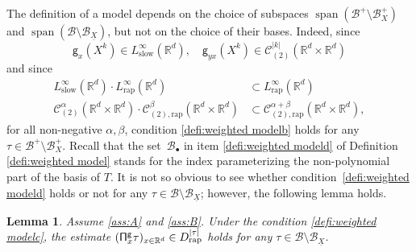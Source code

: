 \documentclass[10pt]{amsart}
\newcommand{\sbullet}{{\scriptscriptstyle\bullet}}
\DeclareMathOperator{\Span}{span}
\theoremstyle{plain}
\newtheorem{lem}[thm]{Lemma}
\theoremstyle{definition}
\newcommand{\rap}{\mathrm{rap}}
\newcommand{\slow}{\mathrm{slow}}
\newcommand{\sfg}{\mathsf{g}}
\newcommand{\bbR}{\mathbb{R}}
\newcommand{\mcB}{\mathcal{B}}
\newcommand{\mcC}{\mathcal{C}}
\begin{document}
The definition of a model depends on the choice of subspaces $\Span (\mcB^+\setminus\mcB_X^+)$ and $\Span (\mcB\setminus\mcB_{\underline{X}})$, but not on the choice of their bases.
Indeed, since
\[
\sfg_x(X^k)\in L_\slow^\infty(\bbR^d),\quad \sfg_{yx}(X^k)\in\mcC_{(2)}^{|k|}(\bbR^d\times\bbR^d)
\]
and since
\begin{align*}
L_\slow^\infty(\bbR^d)\cdot L_\rap^\infty(\bbR^d)&\subset L_\rap^\infty(\bbR^d)\\
\tag*{and}\mcC_{(2)}^\alpha(\bbR^d\times\bbR^d)\cdot\mcC_{(2),\rap}^\beta(\bbR^d\times\bbR^d)&\subset\mcC_{(2),\rap}^{\alpha+\beta}(\bbR^d\times\bbR^d),
\end{align*}
for all non-negative $\alpha,\beta$, condition \eqref{defi:weighted modelb} holds for any $\tau\!\in\!\mcB^+\!\setminus\!\mcB_X^+$. Recall that the set~$\mcB_\sbullet$ in item \eqref{defi:weighted modeld} of Definition \ref{defi:weighted model} stands for the index parameterizing the non-polynomial part of the basis of $T$. It is not so obvious to see whether condition~\eqref{defi:weighted modeld} holds or not for any $\tau\in\mcB\setminus\mcB_{\underline{X}}$; however, the following lemma holds.

\skpt
\begin{lem}
Assume \eqref{ass:A} and \eqref{ass:B}.
Under the condition \eqref{defi:weighted modelc}, the estimate $({\sf\Pi}_x^{\sfg}\tau)_{x\in\bbR^d}\in D_{\rap}^{|\tau|}$ holds for any $\tau\in\mcB\setminus\mcB_{\underline{X}}$.
\end{lem}
\end{document}
